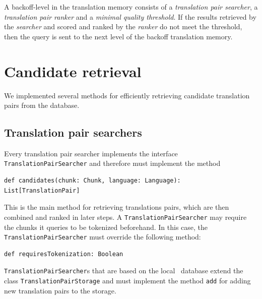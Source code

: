 A backoff-level in the translation memory consists of a \emph{translation pair
searcher}, a \emph{translation pair ranker} and a \emph{minimal quality
threshold}. 
If the results retrieved by the \emph{searcher} and scored and ranked by
the \emph{ranker} do not meet the threshold, then the query is sent to the 
next level of the backoff translation memory. 


\section{Candidate retrieval}
\label{sec:candidate_retrieval}

We implemented several methods for efficiently retrieving candidate
translation pairs from the database. 


\subsection{Translation pair searchers}

Every translation pair searcher implements the interface {\tt TranslationPairSearcher} and therefore must implement the method 

\vspace*{0.5em}

\begin{lstlisting}
def candidates(chunk: Chunk, language: Language): List[TranslationPair]
\end{lstlisting}

This is the main method for retrieving translations pairs, which are then combined and ranked in later steps. A {\tt TranslationPairSearcher} may require the chunks it queries to be tokenized beforehand. In this case, the {\tt TranslationPairSearcher} must override the following method:

\vspace*{0.5em}

\begin{lstlisting}
def requiresTokenization: Boolean
\end{lstlisting}

\vspace*{0.5em}



{\tt TranslationPairSearcher}s that are based on the local \postgres~database extend the class {\tt TranslationPairStorage} and must implement the method {\tt add} for adding new translation pairs to the storage.

